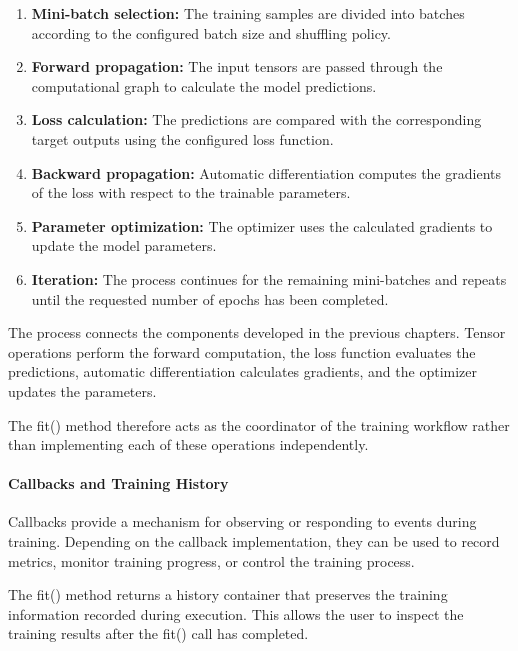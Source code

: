 \begin{enumerate}
    \item \textbf{Mini-batch selection:}
    The training samples are divided into batches according
    to the configured batch size and shuffling policy.

    \item \textbf{Forward propagation:}
    The input tensors are passed through the computational
    graph to calculate the model predictions.

    \item \textbf{Loss calculation:}
    The predictions are compared with the corresponding
    target outputs using the configured loss function.

    \item \textbf{Backward propagation:}
    Automatic differentiation computes the gradients of
    the loss with respect to the trainable parameters.

    \item \textbf{Parameter optimization:}
    The optimizer uses the calculated gradients to update
    the model parameters.

    \item \textbf{Iteration:}
    The process continues for the remaining mini-batches
    and repeats until the requested number of epochs
    has been completed.
\end{enumerate}

The process connects the components developed in the
previous chapters. Tensor operations perform the forward
computation, the loss function evaluates the predictions,
automatic differentiation calculates gradients, and the
optimizer updates the parameters.

The fit() method therefore acts as the coordinator of
the training workflow rather than implementing each of
these operations independently.

\paragraph{Callbacks and Training History}

Callbacks provide a mechanism for observing or responding
to events during training. Depending on the callback
implementation, they can be used to record metrics,
monitor training progress, or control the training process.

The fit() method returns a history container that preserves
the training information recorded during execution.
This allows the user to inspect the training results
after the fit() call has completed.

